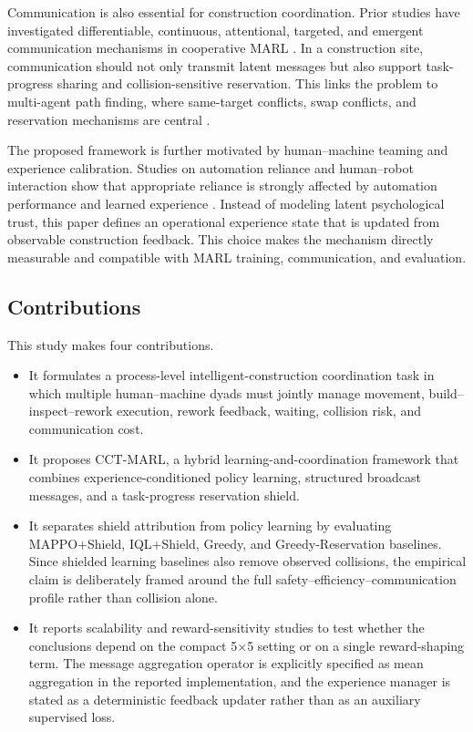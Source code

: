 \documentclass[fleqn,10pt]{wlpeerj}
\begin{document}
Communication is also essential for construction coordination. Prior studies have investigated differentiable, continuous, attentional, targeted, and emergent communication mechanisms in cooperative MARL \cite{Sukhbaatar2016CommNet,Foerster2016DIAL,Jiang2018ATOC,Das2019TarMAC,Peng2017BiCNet,Mordatch2018EmergentLanguage}. In a construction site, communication should not only transmit latent messages but also support task-progress sharing and collision-sensitive reservation. This links the problem to multi-agent path finding, where same-target conflicts, swap conflicts, and reservation mechanisms are central \cite{Sharon2015CBS,Stern2019MAPF,MaKoenig2016TAPF,Cap2015DecentralizedPlanning,Li2021LifelongMAPF}.

The proposed framework is further motivated by human--machine teaming and experience calibration. Studies on automation reliance and human--robot interaction show that appropriate reliance is strongly affected by automation performance and learned experience \cite{LeeSee2004Trust,HoffBashir2015Trust,Hancock2011TrustHRI,ChenBarnes2014HumanAgentTeaming,GoodrichSchultz2007HRI,Parasuraman2000LevelsAutomation}. Instead of modeling latent psychological trust, this paper defines an operational experience state that is updated from observable construction feedback. This choice makes the mechanism directly measurable and compatible with MARL training, communication, and evaluation.


\subsection{Contributions}

This study makes four contributions.
\begin{itemize}
    \item It formulates a process-level intelligent-construction coordination task in which multiple human--machine dyads must jointly manage movement, build--inspect--rework execution, rework feedback, waiting, collision risk, and communication cost.
    \item It proposes CCT-MARL, a hybrid learning-and-coordination framework that combines experience-conditioned policy learning, structured broadcast messages, and a task-progress reservation shield.
    \item It separates shield attribution from policy learning by evaluating MAPPO+Shield, IQL+Shield, Greedy, and Greedy-Reservation baselines. Since shielded learning baselines also remove observed collisions, the empirical claim is deliberately framed around the full safety--efficiency--communication profile rather than collision alone.
    \item It reports scalability and reward-sensitivity studies to test whether the conclusions depend on the compact 5$\times$5 setting or on a single reward-shaping term. The message aggregation operator is explicitly specified as mean aggregation in the reported implementation, and the experience manager is stated as a deterministic feedback updater rather than as an auxiliary supervised loss.
\end{itemize}
\end{document}
